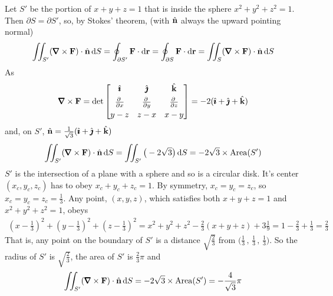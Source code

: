 \begin{solution} 
Let $S'$ be the portion of $x+y+z=1$ that is inside the sphere
$x^2+y^2+z^2=1$. Then $\partial S=\partial S'$, so, by  Stokes' theorem,
(with $\hat{\mathbf{n}}$ always the upward pointing normal)
\begin{equation*}
\dblInt_{S'}(\vnabla\times\vF)\cdot\hn\,\dee{S}
=\oint_{\partial S'}\vF\cdot \dee{\vr}
=\oint_{\partial S}\vF\cdot \dee{\vr}
=\dblInt_{S}(\vnabla\times\vF)\cdot\hn\,\dee{S}
\end{equation*}
As
\begin{align*}
\vnabla\times\vF=\det\left[\begin{matrix}\hi & \hj & \hk \\[0.05in]
                  \pdiff{}{x} &
                  \pdiff{}{y} &
                  \pdiff{}{z} \\[0.05in]
                  y-z & z-x & x-y \end{matrix}\right] 
=-2(\hi+\hj+\hk)
\end{align*}
and, on $S'$,  
$\hat{\mathbf{n}}=\frac{1}{\sqrt{3}}(\hat{\pmb{\imath}}+\hat{\pmb{\jmath}}+\hat{\mathbf{k}})$
\begin{equation*}
\dblInt_{S'}(\vnabla\times\vF)\cdot\hn\,\dee{S}
=\dblInt_{S'}\big(-2\sqrt{3}\big)\,\dee{S}
=-2\sqrt{3}\times{\rm Area}(S')
\end{equation*}
$S'$ is the intersection of a plane with a sphere and so is a circular disk. It's center $(x_c,y_c,z_c)$ has to obey 
$x_c+y_c+z_c=1$. By symmetry, $x_c=y_c=z_c$, so $x_c=y_c=z_c=\frac{1}{3}$.
Any point, $(x,y,z)$, which satisfies both $x+y+z=1$ and $x^2+y^2+z^2=1$,
obeys
\begin{align*}
\left(x-\frac{1}{3}\right)^2+\left(y-\frac{1}{3}\right)^2
+\left(z-\frac{1}{3}\right)^2
=x^2+y^2+z^2-\frac{2}{3}(x+y+z)+3\frac{1}{9}
=1-\frac{2}{3} +\frac{1}{3}=\frac{2}{3}
\end{align*}
That is, any point on the boundary of $S'$ is a distance $\sqrt{\frac{2}{3}}$
from $\big(\frac{1}{3}\,,\,\frac{1}{3}\,,\,\frac{1}{3}\big)$.  
So the radius of $S'$ is $\sqrt{\frac{2}{3}}$,
the area of $S'$ is $\frac{2}{3}\pi$ and 
\begin{equation*}
\dblInt_{S'}(\vnabla\times\vF)\cdot\hn\,\dee{S}
=-2\sqrt{3}\times{\rm Area}(S')
=-\frac{4}{\sqrt{3}}\pi
\end{equation*}

\end{solution}






